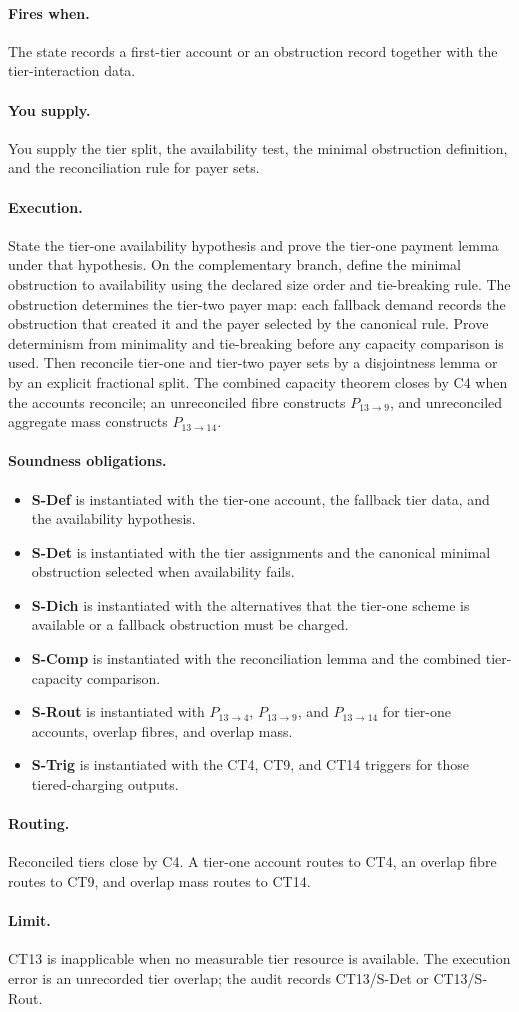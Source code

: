 \documentclass[
  11pt,
]{article}
\providecommand{\tightlist}{%
  \setlength{\itemsep}{0pt}\setlength{\parskip}{0pt}}
\theoremstyle{definition}
\newcommand{\ctpar}[1]{\paragraph{#1.}}
\begin{document}
\ctpar{Fires when}
The state records a first-tier account or an obstruction record together
with the tier-interaction data.

\ctpar{You supply}
You supply the tier split, the availability test, the minimal obstruction
definition, and the reconciliation rule for payer sets.

\ctpar{Execution}
State the tier-one availability hypothesis and prove the tier-one payment
lemma under that hypothesis.  On the complementary branch, define the
minimal obstruction to availability using the declared size order and
tie-breaking rule.  The obstruction determines the tier-two payer map:
each fallback demand records the obstruction that created it and the
payer selected by the canonical rule.  Prove determinism from
minimality and tie-breaking before any capacity comparison is used.  Then
reconcile tier-one and tier-two payer sets by a disjointness lemma or by
an explicit fractional split.  The combined capacity theorem closes by
C4 when the accounts reconcile; an unreconciled fibre constructs
\(P_{13\to9}\), and unreconciled aggregate mass constructs
\(P_{13\to14}\).

\ctpar{Soundness obligations}
\begin{itemize}
\tightlist
\item \textbf{S-Def} is instantiated with the tier-one account, the fallback tier data, and the availability hypothesis.
\item \textbf{S-Det} is instantiated with the tier assignments and the canonical minimal obstruction selected when availability fails.
\item \textbf{S-Dich} is instantiated with the alternatives that the tier-one scheme is available or a fallback obstruction must be charged.
\item \textbf{S-Comp} is instantiated with the reconciliation lemma and the combined tier-capacity comparison.
\item \textbf{S-Rout} is instantiated with \(P_{13\to4}\), \(P_{13\to9}\), and \(P_{13\to14}\) for tier-one accounts, overlap fibres, and overlap mass.
\item \textbf{S-Trig} is instantiated with the CT4, CT9, and CT14 triggers for those tiered-charging outputs.
\end{itemize}

\ctpar{Routing}
Reconciled tiers close by C4.  A tier-one account routes to CT4, an
overlap fibre routes to CT9, and overlap mass routes to CT14.

\ctpar{Limit}
CT13 is inapplicable when no measurable tier resource is available. The
execution error is an unrecorded tier overlap; the audit records
CT13/S-Det or CT13/S-Rout.
\end{document}
